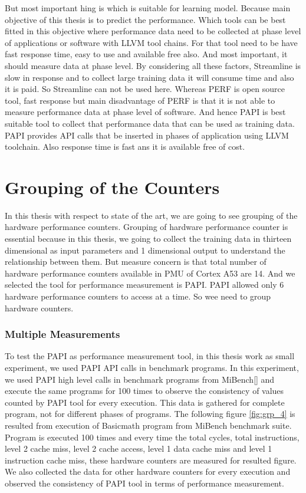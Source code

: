 \par But most important hing is which is suitable for learning model. Because main objective of this thesis is to predict the performance. Which tools can be best fitted in this objective where performance data need to be collected at phase level of applications or software with LLVM tool chains. For that tool need to be have fast response time, easy to use and available free also. And most important, it should measure data at phase level. By considering all these factors, Streamline is slow in response and to collect large training data it will consume time and also it is paid. So Streamline can not be used here. Whereas PERF is open source tool, fast response but main disadvantage of PERF is that it is not able to measure performance data at phase level of software. And hence PAPI is best suitable tool to collect that performance data that can be used as training data. PAPI provides API calls that be inserted in phases of application using LLVM toolchain. Also response time is fast ans it is available free of cost.

\section{Grouping of the Counters}
In this thesis with respect to state of the art, we are going to see grouping of the hardware performance counters. Grouping of hardware performance counter is essential because in this thesis, we going to collect the training data in thirteen dimensional as input parameters and 1 dimensional output to understand the relationship between them. But measure concern is that total number of hardware performance counters available in PMU of Cortex A53 are 14. And we selected the tool for performance measurement is PAPI. PAPI allowed only 6 hardware performance counters to access at a time. So wee need to group hardware counters. 

\subsubsection{Multiple Measurements}
To test the PAPI as performance measurement tool, in this thesis work as small experiment, we used PAPI API calls in benchmark programs. In this experiment, we used PAPI high level calls in benchmark programs from MiBench[] and execute the same programs for 100 times to observe the consistency of values counted by PAPI tool for every execution. This data is gathered for complete program, not for different phases of programs. The following figure \ref{fig:grp_4} is resulted from execution of Basicmath program from MiBench benchmark suite. Program is executed 100 times and every time the total cycles, total instructions, level 2 cache miss, level 2 cache access, level 1 data cache miss and level 1 instruction cache miss, these hardware counters are measured for resulted figure. We also collected the data for other hardware counters for every execution and observed the consistency of PAPI tool in terms of performance measurement. 

